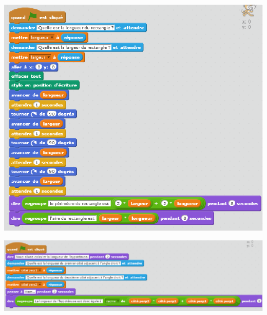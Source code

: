 \documentclass[a4paper,11pt]{article}
\begin{document}
\begin{center}
\includegraphics[scale=1]{scratch-rect.eps} 
\end{center}



\begin{center}
\includegraphics[scale=1]{scratch-pytha.eps} 
\end{center}
\end{document}
